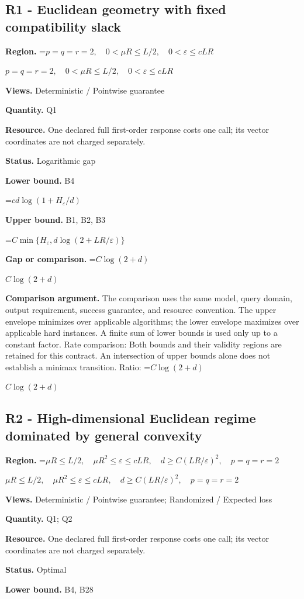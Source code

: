 \documentclass[10pt,a4paper]{article}
\newcommand{\AtlasMath}[1]{\par\begingroup\centering\setbox0=\hbox{$\displaystyle #1$}\ifdim\wd0>1.4\linewidth\typeout{ATLAS WIDE FORMULA: \the\wd0}\fi\ifdim\wd0>\linewidth\resizebox{\linewidth}{!}{\box0}\else\box0\fi\par\endgroup}
\newcommand{\AtlasInlineMath}[1]{\begingroup\setbox0=\hbox{$#1$}\ifdim\wd0>.4\linewidth\endgroup\AtlasMath{#1}\else\endgroup$#1$\fi}
\begin{document}
\subsection{R1 - Euclidean geometry with fixed compatibility slack}
\textbf{Region.} \AtlasInlineMath{p=q=r=2,\quad0<\mu R\le L/2,\quad0<\varepsilon\le cLR}

\textbf{Views.} Deterministic / Pointwise guarantee

\textbf{Quantity.} Q1

\textbf{Resource.} One declared full first-order response costs one call; its vector coordinates are not charged separately.

\textbf{Status.} Logarithmic gap

\textbf{Lower bound.} B4

\AtlasMath{cd\log(1+H_\varepsilon/d)}
\textbf{Upper bound.} B1, B2, B3

\AtlasMath{C\min\{H_\varepsilon,d\log(2+LR/\varepsilon)\}}
\textbf{Gap or comparison.} \AtlasInlineMath{C\log(2+d)}

\textbf{Comparison argument.} The comparison uses the same model, query domain, output requirement, success guarantee, and resource convention. The upper envelope minimizes over applicable algorithms; the lower envelope maximizes over applicable hard instances. A finite sum of lower bounds is used only up to a constant factor. Rate comparison: Both bounds and their validity regions are retained for this contract. An intersection of upper bounds alone does not establish a minimax transition. Ratio: \AtlasInlineMath{C\log(2+d)}

\subsection{R2 - High-dimensional Euclidean regime dominated by general convexity}
\textbf{Region.} \AtlasInlineMath{\mu R\le L/2,\quad\mu R^2\le\varepsilon\le cLR,\quad d\ge C(LR/\varepsilon)^2,\quad p=q=r=2}

\textbf{Views.} Deterministic / Pointwise guarantee; Randomized / Expected loss

\textbf{Quantity.} Q1; Q2

\textbf{Resource.} One declared full first-order response costs one call; its vector coordinates are not charged separately.

\textbf{Status.} Optimal

\textbf{Lower bound.} B4, B28
\end{document}
